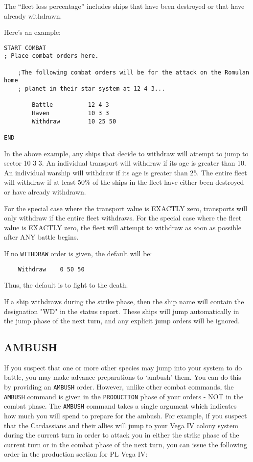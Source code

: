 \documentclass[10pt,titlepage]{article}
\begin{document}
The ``fleet loss percentage'' includes ships that have been destroyed or that
have already withdrawn.

Here's an example:

\begin{verbatim}
START COMBAT
; Place combat orders here.

    ;The following combat orders will be for the attack on the Romulan home
    ; planet in their star system at 12 4 3...

        Battle          12 4 3
        Haven           10 3 3
        Withdraw        10 25 50

END\end{verbatim} 

In the above example, any ships that decide to withdraw will attempt to jump to
sector 10 3 3.  An individual transport will withdraw if its age is greater
than 10.  An individual warship will withdraw if its age is greater than 25.
The entire fleet will withdraw if at least 50\% of the ships in the fleet have
either been destroyed or have already withdrawn.

For the special case where the transport value is EXACTLY zero, transports will
only withdraw if the entire fleet withdraws.  For the special case where the
fleet value is EXACTLY zero, the fleet will attempt to withdraw as soon as
possible after ANY battle begins.

If no \texttt{WITHDRAW} order is given, the default will be:

\begin{verbatim}
	Withdraw	0 50 50\end{verbatim} 

Thus, the default is to fight to the death.

If a ship withdraws during the strike phase, then the ship name will contain
the designation "WD" in the status report.  These ships will jump automatically
in the jump phase of the next turn, and any explicit jump orders will be
ignored.


\subsection{AMBUSH}
\label{sec:ambush}


If you suspect that one or more other species may jump into your system to do
battle, you may make advance preparations to `ambush' them.  You can do this by
providing an \texttt{AMBUSH} order.  However, unlike other combat commands, the \texttt{AMBUSH}
command is given in the \texttt{PRODUCTION} phase of your orders - NOT in the combat
phase.  The \texttt{AMBUSH} command takes a single argument which indicates how much you
will spend to prepare for the ambush.  For example, if you suspect that the
Cardassians and their allies will jump to your Vega IV colony system during the
current turn in order to attack you in either the strike phase of the current
turn or in the combat phase of the next turn, you can issue the following order
in the production section for PL Vega IV:
\end{document}
